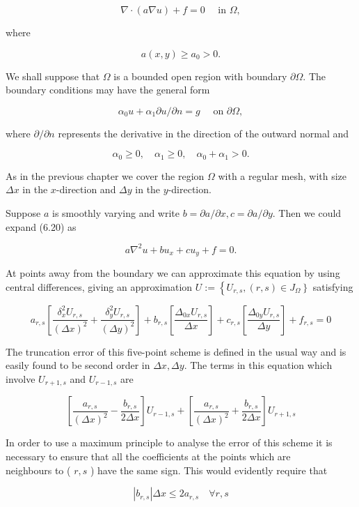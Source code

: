 \documentclass[10pt]{article}
\begin{document}
\[
\nabla \cdot(a \nabla u)+f=0 \quad \text { in } \Omega,
\]

where

\[
a(x, y) \geq a_{0}>0 .
\]

We shall suppose that \(\Omega\) is a bounded open region with boundary \(\partial \Omega\). The boundary conditions may have the general form

\[
\alpha_{0} u+\alpha_{1} \partial u / \partial n=g \quad \text { on } \partial \Omega,
\]

where \(\partial / \partial n\) represents the derivative in the direction of the outward normal and

\[
\alpha_{0} \geq 0, \quad \alpha_{1} \geq 0, \quad \alpha_{0}+\alpha_{1}>0 .
\]

As in the previous chapter we cover the region \(\Omega\) with a regular mesh, with size \(\Delta x\) in the \(x\)-direction and \(\Delta y\) in the \(y\)-direction.

Suppose \(a\) is smoothly varying and write \(b=\partial a / \partial x, c=\partial a / \partial y\). Then we could expand (6.20) as

\[
a \nabla^{2} u+b u_{x}+c u_{y}+f=0 .
\]

At points away from the boundary we can approximate this equation by using central differences, giving an approximation \(U:=\left\{U_{r, s},(r, s) \in\right. \left.J_{\Omega}\right\}\) satisfying

\[
a_{r, s}\left[\frac{\delta_{x}^{2} U_{r, s}}{(\Delta x)^{2}}+\frac{\delta_{y}^{2} U_{r, s}}{(\Delta y)^{2}}\right]+b_{r, s}\left[\frac{\Delta_{0 x} U_{r, s}}{\Delta x}\right]+c_{r, s}\left[\frac{\Delta_{0 y} U_{r, s}}{\Delta y}\right]+f_{r, s}=0
\]

The truncation error of this five-point scheme is defined in the usual way and is easily found to be second order in \(\Delta x, \Delta y\). The terms in this equation which involve \(U_{r+1, s}\) and \(U_{r-1, s}\) are

\[
\left[\frac{a_{r, s}}{(\Delta x)^{2}}-\frac{b_{r, s}}{2 \Delta x}\right] U_{r-1, s}+\left[\frac{a_{r, s}}{(\Delta x)^{2}}+\frac{b_{r, s}}{2 \Delta x}\right] U_{r+1, s}
\]

In order to use a maximum principle to analyse the error of this scheme it is necessary to ensure that all the coefficients at the points which are\\
neighbours to ( \(r, s\) ) have the same sign. This would evidently require that

\[
\left|b_{r, s}\right| \Delta x \leq 2 a_{r, s} \quad \forall r, s
\]
\end{document}
